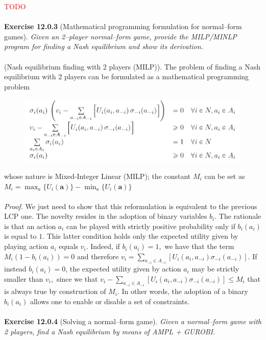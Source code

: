 \textcolor{red}{TODO}\\\\
\textbf{Exercise 12.0.3} (Mathematical programming formulation for normal–form games). \textit{Given an 2–player normal–form game, provide the MILP/MINLP program for finding a Nash equilibrium and show its derivation.}\\\\
(Nash equilibrium finding with 2 players (MILP)). The problem of finding a Nash equilibrium with 2 players can be formulated as a mathematical programming problem
\begin{figure}[H]
\centering
\includegraphics[width=\textwidth]{images/img_2_12_02.png}
\end{figure}
\noindent
whose nature is Mixed-Integer Linear (MILP); the constant $M_i$ can be set as $M_i = \max_{a}\{U_i (\mathbf{a})\} - \min_{a}\{U_i (\mathbf{a})\}$\\\\
\textit{Proof.} We just need to show that this reformulation is equivalent to the previous LCP one. The novelty resides in the adoption of binary variables $b_{i}$. The rationale is that an action $a_{i}$ can be played with strictly positive probability only if $b_{i}\left(a_{i}\right)$ is equal to $1 .$ This latter condition holds only the expected utility given by playing action $a_{i}$ equals $v_{i}$. Indeed, if $b_{i}\left(a_{i}\right)=1,$ we have that the term $M_{i}\left(1-b_{i}\left(a_{i}\right)\right)=0$ and therefore
$v_{i}=\sum_{a_{-i} \in A_{-i}}\left[U_{i}\left(a_{i}, a_{-i}\right) \sigma_{-i}\left(a_{-i}\right)\right]$. If instead $b_{i}\left(a_{i}\right)=0$, the expected utility given by action $a_{i}$ may be strictly
smaller than $v_{i},$ since we that $v_{i}-\sum_{a_{-i} \in A_{-i}}\left[U_{i}\left(a_{i}, a_{-i}\right) \sigma_{-i}\left(a_{-i}\right)\right] \leqslant M_{i}$ that is always true by construction of
$M_{i} .$ In other words, the adoption of a binary $b_{i}\left(a_{i}\right)$ allows one to enable or disable a set of constraints.\\\\
\textbf{Exercise 12.0.4} (Solving a normal–form game). \textit{Given a normal–form game with 2 players, find a Nash equilibrium by means of AMPL + GUROBI.}\\
